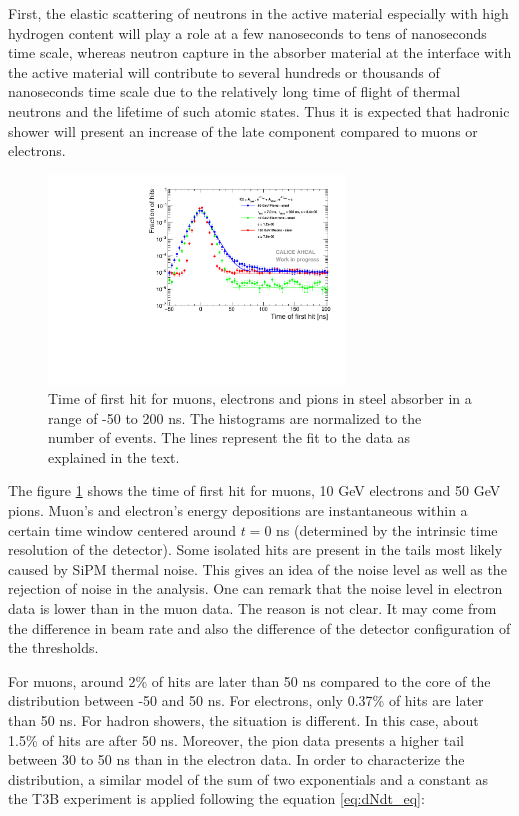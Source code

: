 First, the elastic scattering of neutrons in the active material especially with high hydrogen content will play a role at a few nanoseconds to tens of nanoseconds time scale, whereas neutron capture in the absorber material at the interface with the active material will contribute to several hundreds or thousands of nanoseconds time scale due to the relatively long time of flight of thermal neutrons and the lifetime of such atomic states. Thus it is expected that hadronic shower will present an increase of the late component compared to muons or electrons.

\begin{figure}[htbp!]
	\centering
	\includegraphics[width=0.7\textwidth]{../Thesis_Plots/Timing/Pions/Plots/Timing_dNdt_Comparison.pdf}
	\caption{Time of first hit for muons, electrons and pions in steel absorber in a range of -50 to 200 ns. The histograms are normalized to the number of events. The lines represent the fit to the data as explained in the text.}
	\label{fig:dNdt_Comparison}
\end{figure}

The figure \ref{fig:dNdt_Comparison} shows the time of first hit for muons, 10 GeV electrons and 50 GeV pions. Muon's and electron's energy depositions are instantaneous within a certain time window centered around $t=0$ ns (determined by the intrinsic time resolution of the detector). Some isolated hits are present in the tails most likely caused by SiPM thermal noise. This gives an idea of the noise level as well as the rejection of noise in the analysis. One can remark that the noise level in electron data is lower than in the muon data. The reason is not clear. It may come from the difference in beam rate and also the difference of the detector configuration of the thresholds.

For muons, around 2\% of hits are later than 50 ns compared to the core of the distribution between -50 and 50 ns. For electrons, only 0.37\% of hits are later than 50 ns. For hadron showers, the situation is different. In this case, about 1.5\% of hits are after 50 ns. Moreover, the pion data presents a higher tail between 30 to 50 ns than in the electron data. In order to characterize the distribution, a similar model of the sum of two exponentials and a constant as the T3B experiment \cite{Simon2013} is applied following the equation \ref{eq:dNdt_eq}:

